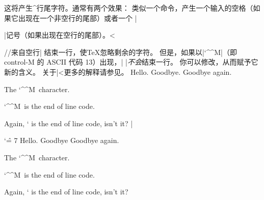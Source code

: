 %
\begindesc
\ctsact  ^^M 
\explain
这将产生^{行尾}字符。通常有两个效果：
\olist
\li 类似一个命令，产生一个输入的空格（如果它出现在一个非空行的尾部）或者一个
|\par|记号（如果出现在空行的尾部）。^^|\par//来自空行|
\li 结束一行，使\TeX{}忽略剩余的字符。
\endolist
\noindent
但是，如果以|`\^^M|（即 control-M 的 ASCII 代码 13）出现，|^^M|\emph{不会}结束一行。
你可以修改，从而赋予它新的含义。
关于|^^|更多的解释请参见。
\example
Hello.^^MGoodbye.
Goodbye again.\par
The \char `\^^M\ character.\par
\number `\^^M\ is the end of line code.\par
Again, \number `^^M is the end of line code,
isn't it? %
|
\produces
{\catcode `\^ = 7 %
Hello.^^MGoodbye
Goodbye again.\par
The \char `\^^M\ character.\par
\number `\^^M\ is the end of line code.\par
Again, \number `^^M is the end of line code,
isn't it?}
\endexample
\enddesc

